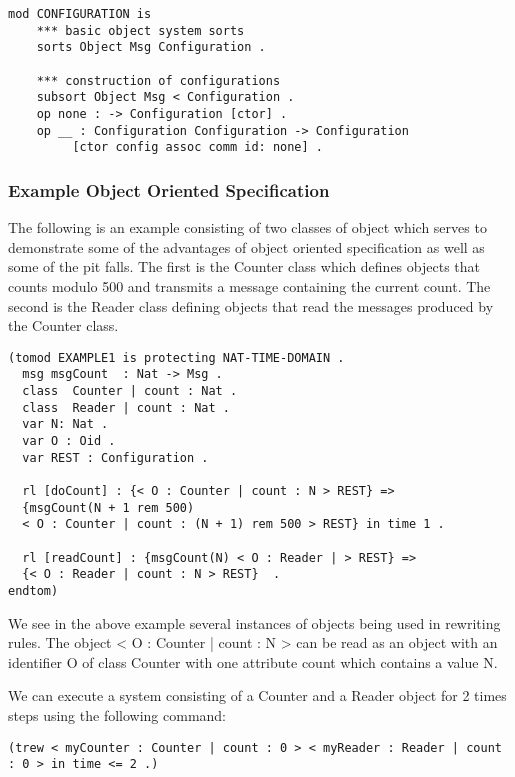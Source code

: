 \begin{lstlisting}[caption = The Maude Configuration module]
mod CONFIGURATION is  
    *** basic object system sorts  
    sorts Object Msg Configuration .  
 
    *** construction of configurations  
    subsort Object Msg < Configuration .  
    op none : -> Configuration [ctor] .  
    op __ : Configuration Configuration -> Configuration  
         [ctor config assoc comm id: none] .
\end{lstlisting}

\subsubsection*{Example Object Oriented Specification}
The following is an example consisting of two classes of object which serves to demonstrate some of the advantages of object oriented specification as well as some of the pit falls. The first is the Counter class which defines objects that counts modulo 500 and transmits a message containing the current count. The second is the Reader class defining objects that read the messages produced by the Counter class. 

\begin{lstlisting}[caption = Example object oriented specification, label = code:rtmaudeexample]
(tomod EXAMPLE1 is protecting NAT-TIME-DOMAIN .
  msg msgCount  : Nat -> Msg .  
  class  Counter | count : Nat .
  class  Reader | count : Nat .
  var N: Nat .
  var O : Oid .
  var REST : Configuration .
 
  rl [doCount] : {< O : Counter | count : N > REST} => 
  {msgCount(N + 1 rem 500)  
  < O : Counter | count : (N + 1) rem 500 > REST} in time 1 . 

  rl [readCount] : {msgCount(N) < O : Reader | > REST} => 
  {< O : Reader | count : N > REST}  . 
endtom)
\end{lstlisting} 
We see in the above example several instances of objects being used in rewriting rules. The object < O : Counter | count : N > can be read as an object with an identifier O of class Counter with one attribute count which contains a value N.

We can execute a system consisting of a Counter  and a Reader object for 2 times steps using the following command:
\begin{center}
\texttt{(trew {< myCounter : Counter |  count : 0 > < myReader : Reader | count : 0 >} in time <= 2 .)}
\end{center}

